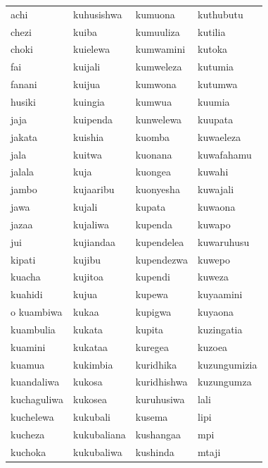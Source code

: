 \documentclass[output=paper,colorlinks,citecolor=brown]{langscibook}
\begin{document}
\begin{table}\small
\begin{tabular}{llll}
\lsptoprule
achi &         kuhusishwa &  kumuona &       kuthubutu \\ 
chezi &        kuiba &       kumuuliza &     kutilia \\ 
choki &        kuielewa &    kumwamini &     kutoka \\ 
fai &          kuijali &     kumweleza &     kutumia\\
fanani &       kuijua &      kumwona &       kutumwa \\ 
husiki &       kuingia &     kumwua &        kuumia \\ 
jaja &         kuipenda &    kunwelewa &     kuupata \\ 
jakata &       kuishia &     kuomba &        kuwaeleza \\ 
jala &         kuitwa &      kuonana &       kuwafahamu \\ 
jalala &       kuja &        kuongea &       kuwahi \\ 
jambo &        kujaaribu &   kuonyesha &     kuwajali \\ 
jawa &         kujali &      kupata &        kuwaona \\ 
jazaa &        kujaliwa &    kupenda &       kuwapo \\ 
jui &          kujiandaa &   kupendelea &    kuwaruhusu \\ 
kipati &       kujibu &      kupendezwa &    kuwepo \\ 
kuacha &       kujitoa &     kupendi &       kuweza \\ 
kuahidi &      kujua &       kupewa &        kuyaamini \\ o
kuambiwa &     kukaa &       kupigwa &       kuyaona \\ 
kuambulia &    kukata &      kupita &        kuzingatia \\ 
kuamini &      kukataa &     kuregea &       kuzoea \\ 
kuamua &       kukimbia &    kuridhika &     kuzungumizia \\ 
kuandaliwa &   kukosa &      kuridhishwa &   kuzungumza \\
kuchaguliwa &  kukosea &     kuruhusiwa &    lali \\ 
kuchelewa &    kukubali &    kusema &        lipi \\ 
kucheza &      kukubaliana & kushangaa &     mpi \\ 
kuchoka &      kukubaliwa &  kushinda &      mtaji \\ 

\end{tabular}
\end{table}
\end{document}
